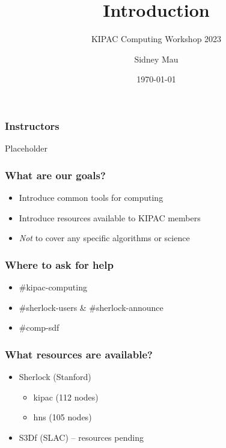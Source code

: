 \documentclass[aspectratio=169]{beamer}
\title{Introduction}
\subtitle{KIPAC Computing Workshop 2023}
\author[S. Mau]{Sidney Mau}
\institute[Stanford]{Stanford University}
\date[\today]{\today}
\begin{document}

\frame{\titlepage}



% 


\begin{frame}
	\frametitle{Instructors}
	Placeholder
\end{frame}

\begin{frame}
	\frametitle{What are our goals?}
	\begin{itemize}
		\item Introduce common tools for computing
		\item Introduce resources available to KIPAC members
		\item \emph{Not} to cover any specific algorithms or science
	\end{itemize}
\end{frame}

\begin{frame}
	\frametitle{Where to ask for help}
	\begin{itemize}
		\item \#kipac-computing
		\item \#sherlock-users \& \#sherlock-announce
		\item \#comp-sdf
	\end{itemize}
\end{frame}

\begin{frame}
	\frametitle{What resources are available?}
	\begin{itemize}
		\item Sherlock (Stanford)
			\begin{itemize}
				\item kipac (112 nodes)
				\item hns (105 nodes)
			\end{itemize}
		\item S3Df (SLAC) -- resources pending
	\end{itemize}
\end{frame}
\end{document}
